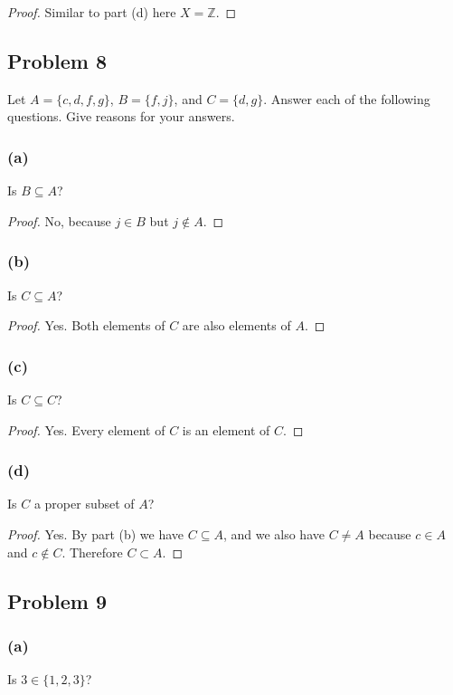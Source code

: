 \documentclass[14pt]{extarticle}
\newcommand{\Z}{\mathbb{Z}}
\begin{document}
\begin{proof}
Similar to part (d) here $X = \Z$.
\end{proof}

\subsection{Problem 8}
Let $A = \{c, d, f, g\}$, $B = \{f, j\}$, and $C = \{d, g\}$. Answer each of the
following questions. Give reasons for your answers.

\subsubsection{(a)}
Is $B \subseteq A$?

\begin{proof}
No, because $j \in B$ but $j \notin A$.
\end{proof}

\subsubsection{(b)}
Is $C \subseteq A$?

\begin{proof}
Yes. Both elements of $C$ are also elements of $A$.
\end{proof}

\subsubsection{(c)}
Is $C \subseteq C$?

\begin{proof}
Yes. Every element of $C$ is an element of $C$.
\end{proof}

\subsubsection{(d)}
Is $C$ a proper subset of $A$?

\begin{proof}
Yes. By part (b) we have $C \subseteq A$, and we also have $C \neq A$ because
$c \in A$ and $c \notin C$. Therefore $C \subset A$.
\end{proof}

\subsection{Problem 9}
\subsubsection{(a)}
Is $3 \in \{1, 2, 3\}$?
\end{document}
